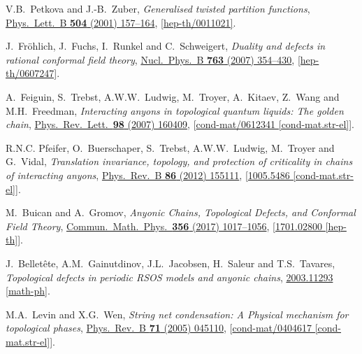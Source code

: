 \newcommand\arxiv[2]      {\href{http://arXiv.org/abs/#1}{#2}}
\newcommand\jdoi[2]        {\href{http://dx.doi.org/#1}{#2}}

\begin{thebibliography}{10}


V.B.~Petkova and J.-B.~Zuber,
{\it Generalised twisted partition functions},
\jdoi{10.1016/S0370-2693(01)00276-3}{Phys.\ Lett.\ B {\bf 504} (2001) 157--164},
\arxiv{hep-th/0011021}{[hep-th/0011021]}.

J.~Fr\"ohlich, J.~Fuchs, I.~Runkel and C.~Schweigert,
{\it Duality and defects in rational conformal field theory},
\jdoi{10.1016/j.nuclphysb.2006.11.017}{Nucl.\ Phys.\ B {\bf 763} (2007) 354--430},
\arxiv{hep-th/0607247}{[hep-th/0607247]}.

A.~Feiguin, S.~Trebst, A.W.W.~Ludwig, M.~Troyer, A.~Kitaev, Z.~Wang and M.H.~Freedman,
\textit{Interacting anyons in topological quantum liquids: The golden chain},
\jdoi{10.1103/PhysRevLett.98.160409}{Phys.\ Rev.\ Lett.\ \textbf{98} (2007) 160409},
[\arxiv{cond-mat/0612341}{cond-mat/0612341 [cond-mat.str-el]}].

R.N.C. Pfeifer, O.~Buerschaper, S.~Trebst, A.W.W.~Ludwig, M.~Troyer and G.~Vidal,
\textit{Translation invariance, topology, and protection of criticality in chains of interacting anyons},
\jdoi{10.1103/physrevb.86.155111}{Phys.\ Rev.\ B \textbf{86} (2012) 155111},
[\arxiv{1005.5486}{1005.5486 [cond-mat.str-el]}].

M.~Buican and A.~Gromov,
\textit{Anyonic Chains, Topological Defects, and Conformal Field Theory},
\jdoi{10.1007/s00220-017-2995-6}{Commun.\ Math.\ Phys.\ \textbf{356} (2017) 1017--1056},
[\arxiv{1701.02800}{1701.02800 [hep-th]}].

J.~Bellet\^ete, A.M.~Gainutdinov, J.L.~Jacobsen, H.~Saleur and T.S.~Tavares,
\textit{Topological defects in periodic RSOS models and anyonic chains},
\arxiv{2003.11293}{2003.11293 [math-ph]}.

M.A.~Levin and X.G.~Wen,
\textit{String net condensation: A Physical mechanism for topological phases},
\jdoi{10.1103/PhysRevB.71.045110}{Phys.\ Rev.\ B \textbf{71} (2005) 045110},
[\arxiv{cond-mat/0404617}{cond-mat/0404617 [cond-mat.str-el]}].


\end{thebibliography}
